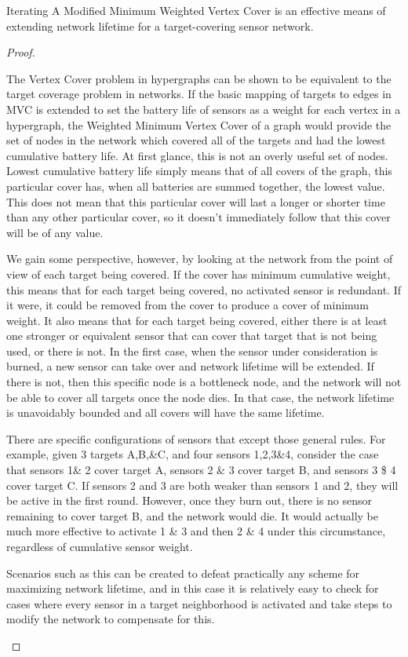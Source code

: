 


\begin{thm}
Iterating A Modified Minimum Weighted Vertex Cover is an effective means of extending network lifetime for a target-covering sensor network.
\end{thm}

\begin{proof}
\begin{smy}
The Vertex Cover problem in hypergraphs can be shown to be equivalent to the target coverage problem in networks. If the basic mapping of targets to edges in MVC is extended to set the battery life of sensors as a weight for each vertex in a hypergraph, the Weighted Minimum Vertex Cover of a graph would provide the set of nodes in the network which covered all of the targets and had the lowest cumulative battery life. At first glance, this is not an overly useful set of nodes. Lowest cumulative battery life simply means that of all covers of the graph, this particular cover has, when all batteries are summed together, the lowest value. This does not mean that this particular cover will last a longer or shorter time than any other particular cover, so it doesn't immediately follow that this cover will be of any value.

We gain some perspective, however, by looking at the network from the point of view of each target being covered. If the cover has minimum cumulative weight, this means that for each target being covered, no activated sensor is redundant. If it were, it could be removed from the cover to produce a cover of minimum weight. It also means that for each target being covered, either there is at least one stronger or equivalent sensor that can cover that target that is not being used, or there is not. In the first case, when the sensor under consideration is burned, a new sensor can take over and network lifetime will be extended. If there is not, then this specific node is a bottleneck node, and the network will not be able to cover all targets once the node dies. In that case, the network lifetime is unavoidably bounded and all covers will have the same lifetime.

There are specific configurations of sensors that except those general rules. For example, given 3 targets A,B,\&C, and four sensors 1,2,3\&4, consider the case that sensors 1\& 2 cover target A, sensors 2 \& 3 cover target B, and sensors 3 \$ 4 cover target C. If sensors 2 and 3 are both weaker than sensors 1 and 2, they will be active in the first round. However, once they burn out, there is no sensor remaining to cover target B, and the network would die. It would actually be much more effective to activate 1 \& 3 and then 2 \& 4 under this circumstance, regardless of cumulative sensor weight. 

Scenarios such as this can be created to defeat practically any scheme for maximizing network lifetime, and in this case it is relatively easy to check for cases where every sensor in a target neighborhood is activated and take steps to modify the network to compensate for this.
\end{smy}
\end{proof}
